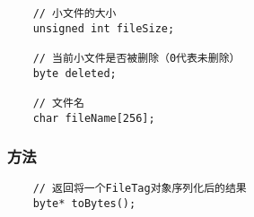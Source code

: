 \documentclass[11pt, a4paper]{book}
\begin{document}
\begin{CJK*}{UTF8}{gbsn}
\begin{lstlisting}
    // 小文件的大小
    unsigned int fileSize;

    // 当前小文件是否被删除（0代表未删除）
    byte deleted;

    // 文件名
    char fileName[256];
  \end{lstlisting}

  \subsubsection{方法}
  
  \begin{lstlisting}
    // 返回将一个FileTag对象序列化后的结果
    byte* toBytes();
  \end{lstlisting}

  \newpage

\end{CJK*}
\end{document}
